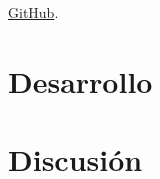 \documentclass[runningheads]{llncs}
\begin{document}

         \href{https://github.com/Alexander-Guacan/Proyecto_Unidad_2.git}{GitHub}.

    \section{Desarrollo}



        

        


    \section{Discusión}
\end{document}
